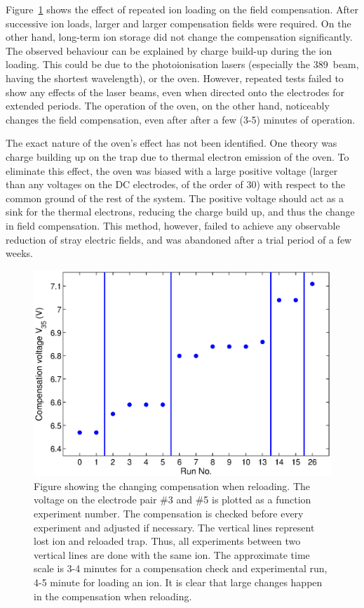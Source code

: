 Figure~\ref{fig:loadcompensation} shows the effect of repeated ion loading on the field compensation. After successive ion loads, larger and larger compensation fields were required. On the other hand, long-term ion storage did not change the compensation significantly. The observed behaviour can be explained by charge build-up during the ion loading. This could be due to the photoionisation lasers (especially the 389\nm\, beam, having the shortest wavelength), or the \CaI{} oven. However, repeated tests failed to show any effects of the laser beams, even when directed onto the electrodes for extended periods. The operation of the \CaI{} oven, on the other hand, noticeably changes the field compensation, even after after a few (3-5) minutes of operation. 

The exact nature of the oven's effect has not been identified. One theory was charge building up on the trap due to thermal electron emission of the \CaI{} oven. To eliminate this effect, the oven was biased with a large positive voltage (larger than any voltages on the DC electrodes, of the order of 30\V) with respect to the common ground of the rest of the system. The positive voltage should act as a sink for the thermal electrons, reducing the charge build up, and thus the change in field compensation. This method, however, failed to achieve any observable reduction of stray electric fields, and was abandoned after a trial period of a few weeks.


\begin{figure}[h!t]
\centering
\includegraphics[width=12.5cm]{chapter6/loadcompensation/loadcompensation}
\caption[Changing compensation when reloading]{Figure showing the changing compensation when reloading. The voltage on the electrode pair \#3 and \#5 is plotted as a function experiment number. The compensation is checked before every experiment and adjusted if necessary. The vertical lines represent lost ion and reloaded trap. Thus, all experiments between two vertical lines are done with the same ion. The approximate time scale is 3-4 minutes for a compensation check and experimental run, 4-5 minute for loading an ion. It is clear that large changes happen in the compensation when reloading. }
\label{fig:loadcompensation}
\end{figure} 



